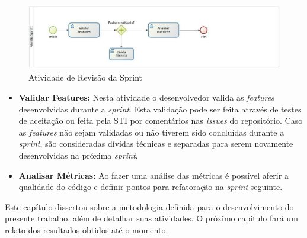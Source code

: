 \begin{figure}[ht]
	\centering
	\includegraphics[keepaspectratio=true,scale=0.9, width=\textwidth]{figuras/fig10.eps}
	\caption{Atividade de Revisão da Sprint}
	\label{fig10}
\end{figure}

\begin{itemize}

	\item \textbf{Validar Features:} Nesta atividade o desenvolvedor valida as \textit{features} desenvolvidas durante a \textit{sprint}. Esta validação pode ser feita através de testes de aceitação ou feita pela STI por comentários nas \textit{issues} do repositório. Caso as \textit{features} não sejam validadas ou não tiverem sido concluídas durante a \textit{sprint}, são consideradas dívidas técnicas e separadas para serem novamente desenvolvidas na próxima \textit{sprint}.

	\item \textbf{Analisar Métricas:} Ao fazer uma análise das métricas é possível aferir a qualidade do código e definir pontos para refatoração na \textit{sprint} seguinte.

\end{itemize}

Este capítulo dissertou sobre a metodologia definida para o desenvolvimento do presente trabalho, além de detalhar suas atividades. O próximo capítulo fará um relato dos resultados obtidos até o momento.
